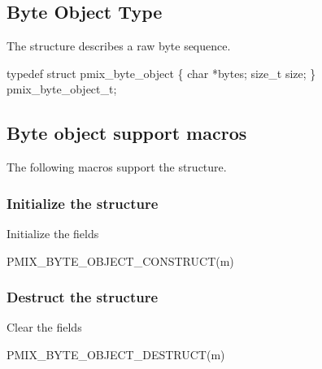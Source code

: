 \subsection{Byte Object Type}

The  structure describes a raw byte sequence.

\cspecificstart
\begin{codepar}
typedef struct pmix_byte_object \{
    char *bytes;
    size_t size;
\} pmix_byte_object_t;
\end{codepar}
\cspecificend

\subsection{Byte object support macros}
The following macros support the  structure.

\subsubsection{Initialize the  structure}

Initialize the  fields

\cspecificstart
\begin{codepar}
PMIX_BYTE_OBJECT_CONSTRUCT(m)
\end{codepar}
\cspecificend

\begin{arglist}
\end{arglist}

\subsubsection{Destruct the  structure}

Clear the  fields

\cspecificstart
\begin{codepar}
PMIX_BYTE_OBJECT_DESTRUCT(m)
\end{codepar}
\cspecificend

\begin{arglist}
\end{arglist}

